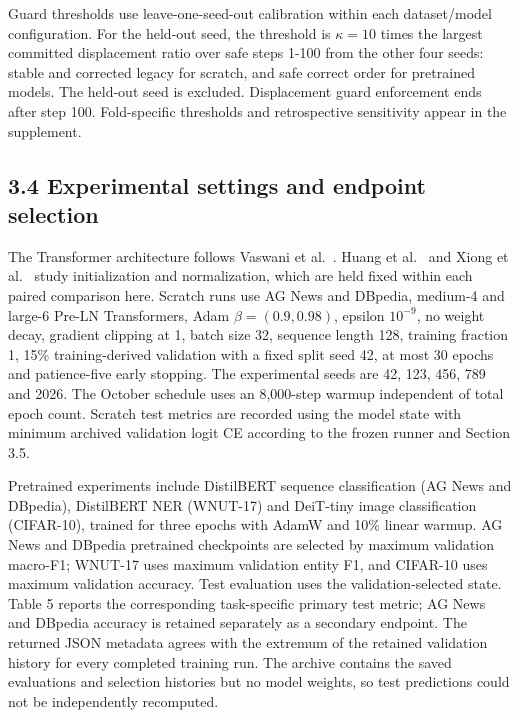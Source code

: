 \documentclass[smallextended]{svjour3}
\begin{document}
Guard thresholds use leave-one-seed-out calibration within each dataset/model configuration. For the held-out seed, the threshold is \(\kappa=10\) times the largest committed displacement ratio over safe steps 1-100 from the other four seeds: stable and corrected legacy for scratch, and safe correct order for pretrained models. The held-out seed is excluded. Displacement guard enforcement ends after step 100. Fold-specific thresholds and retrospective sensitivity appear in the supplement.

\subsection{3.4 Experimental settings and endpoint selection}\label{experimental-settings-and-endpoint-selection}

The Transformer architecture follows Vaswani et al.~\citep{vaswani2017attention}. Huang et al.~\citep{huang2020initialization} and Xiong et al.~\citep{xiong2020layernorm} study initialization and normalization, which are held fixed within each paired comparison here. Scratch runs use AG News and DBpedia, medium-4 and large-6 Pre-LN Transformers, Adam \(\beta=(0.9,0.98)\), epsilon \(10^{-9}\), no weight decay, gradient clipping at 1, batch size 32, sequence length 128, training fraction 1, 15\% training-derived validation with a fixed split seed 42, at most 30 epochs and patience-five early stopping. The experimental seeds are 42, 123, 456, 789 and 2026. The October schedule uses an 8,000-step warmup independent of total epoch count. Scratch test metrics are recorded using the model state with minimum archived validation logit CE according to the frozen runner and Section 3.5.

Pretrained experiments include DistilBERT sequence classification (AG News and DBpedia), DistilBERT NER (WNUT-17) and DeiT-tiny image classification (CIFAR-10), trained for three epochs with AdamW \citep{loshchilov2019decoupled} and 10\% linear warmup. AG News and DBpedia pretrained checkpoints are selected by maximum validation macro-F1; WNUT-17 uses maximum validation entity F1, and CIFAR-10 uses maximum validation accuracy. Test evaluation uses the validation-selected state. Table 5 reports the corresponding task-specific primary test metric; AG News and DBpedia accuracy is retained separately as a secondary endpoint. The returned JSON metadata agrees with the extremum of the retained validation history for every completed training run. The archive contains the saved evaluations and selection histories but no model weights, so test predictions could not be independently recomputed.
\end{document}
